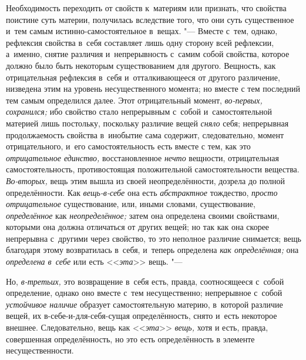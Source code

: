 Необходимость переходить от свойств к~материям или признать, что свойства
поистине суть материи, получилась вследствие того, что они суть
существенное и~тем самым истинно-самостоятельное в~вещах. "--- Вместе с~тем,
однако, рефлексия свойства в~себя составляет лишь одну сторону всей
рефлексии, а~именно, снятие различия и~непрерывность с~самим собой
свойства, которое должно было быть некоторым существованием для другого.
Вещность, как отрицательная рефлексия в~себя и~отталкивающееся от другого
различение, низведена этим на уровень несущественного момента; но вместе с
тем последний тем самым определился далее. Этот отрицательный момент,
{\em во-первых, сохранился;}
ибо свойство стало непрерывным с~собой и~самостоятельной материей лишь
постольку, поскольку различие вещей {\em сняло} себя;
непрерывная продолжаемость свойства в~инобытие сама содержит,
следовательно, момент отрицательного, и~его самостоятельность есть вместе с
тем, как это {\em отрицательное единство,}
восстановленное {\em нечто} вещности, отрицательная
самостоятельность, противостоящая положительной самостоятельности вещества.
{\em Во-вторых,} вещь этим вышла из своей
неопределённости, дозрела до полной определённости. Как
{\em вещь-в-себе} она есть {\em абстрактное} тождество,
{\em просто отрицательное} существование, или, иными
словами, существование, {\em определённое} как
{\em неопределённое;} затем она определена своими
свойствами, которыми она должна отличаться от других вещей; но так как она
скорее непрерывна с~другими через свойство, то это неполное различие
снимается; вещь благодаря этому возвратилась в~себя, и~теперь определена
{\em как определённая;} она {\em определена в~себе} или есть
<<{\em эта}>> вещь. "---

Но, {\em в-третьих,} это возвращение в~себя есть,
правда, соотносящееся с~собой определение, однако оно вместе с~тем
несущественно; непрерывное с~собой {\em устойчивое наличие}
образует самостоятельную материю, в~которой различие вещей, их
в-себе-и-для-себя-сущая определённость, снято и~есть некоторое внешнее.
Следовательно, вещь как <<{\em эта}>> {\em вещь,} хотя и
есть, правда, совершенная определённость, но это есть определённость в
элементе несущественности.

